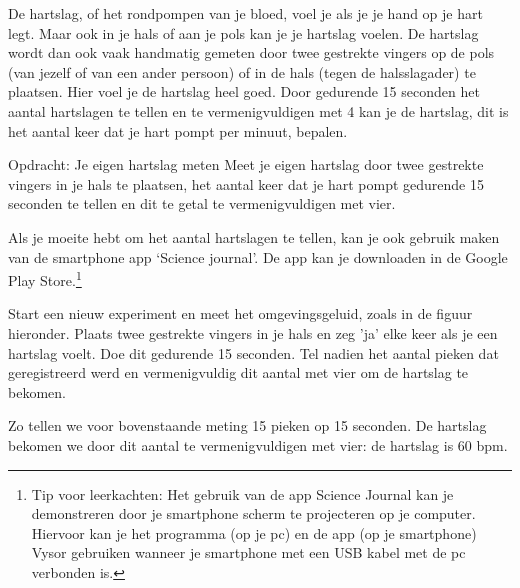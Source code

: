 De hartslag, of het rondpompen van je bloed, voel je als je je hand op je hart legt. Maar ook in je hals of aan je pols kan je je hartslag voelen. De hartslag wordt dan ook vaak handmatig gemeten door twee gestrekte vingers op de pols (van jezelf of van een ander persoon) of in de hals (tegen de halsslagader) te plaatsen. Hier voel je de hartslag heel goed. Door gedurende 15 seconden het aantal hartslagen te tellen en te vermenigvuldigen met 4 kan je de hartslag, dit is het aantal keer dat je hart pompt per minuut, bepalen.

\begin{opdracht}{Opdracht: Je eigen hartslag meten}
	Meet je eigen hartslag door twee gestrekte vingers in je hals te plaatsen, het aantal keer dat je hart pompt gedurende 15 seconden te tellen en dit te getal te vermenigvuldigen met vier.
	
	Als je moeite hebt om het aantal hartslagen te tellen, kan je ook gebruik maken van de smartphone app \textquoteleft Science journal\textquoteright. De app kan je downloaden in de Google Play Store.\footnote{Tip voor leerkachten:
	Het gebruik van de app Science Journal kan je demonstreren door je smartphone scherm te projecteren op je computer. Hiervoor kan je het programma (op je pc) en de app (op je smartphone) Vysor gebruiken wanneer je smartphone met een USB kabel met de pc verbonden is.}
	
	Start een nieuw experiment en meet het omgevingsgeluid, zoals in de figuur hieronder. Plaats twee gestrekte vingers in je hals en zeg 'ja' elke keer als je een hartslag voelt. Doe dit gedurende 15 seconden. Tel nadien het aantal pieken dat geregistreerd werd en vermenigvuldig dit aantal met vier om de hartslag te bekomen.
	
	\begin{minipage}{.5\linewidth}
	\end{minipage}
	\begin{minipage}{.5\linewidth}
	\end{minipage}

	Zo tellen we voor bovenstaande meting 15 pieken op 15 seconden. De hartslag bekomen we door dit aantal te vermenigvuldigen met vier: de hartslag is 60 bpm.

\end{opdracht}

